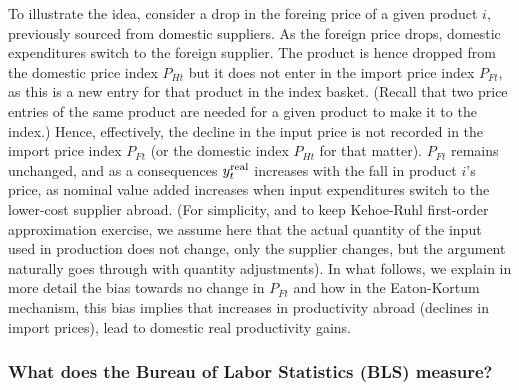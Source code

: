 \documentclass[12pt]{article}
\begin{document}
To illustrate the idea, consider a drop in the foreing price of a given
product $i,$ previously sourced from domestic suppliers. As the foreign
price drops, domestic expenditures switch to the foreign supplier. The
product is hence dropped from the domestic price index $P_{Ht}$ but it does
not enter in the import price index $P_{Ft},$ as this is a new entry for
that product in the index basket. (Recall that two price entries of the same
product are needed for a given product to make it to the index.) Hence,
effectively, the decline in the input price is not recorded in the import
price index $P_{Ft}$ (or the domestic index $P_{Ht}$ for that matter). $%
P_{Ft}$ remains unchanged, and as a consequences $y_{t}^{\mathop{\rm real}}$
increases with the fall in product $i$'s price, as nominal value added
increases when input expenditures switch to the lower-cost supplier abroad.
(For simplicity, and to keep Kehoe-Ruhl first-order approximation exercise,
we assume here that the actual quantity of the input used in production does
not change, only the supplier changes, but the argument naturally goes
through with quantity adjustments). In what follows, we explain in more
detail the bias towards no change in $P_{Ft}$ and how in the Eaton-Kortum
mechanism, this bias implies that increases in productivity abroad (declines
in import prices), lead to domestic real productivity gains.

\subsubsection{What does the Bureau of Labor Statistics (BLS) measure?}
\end{document}
